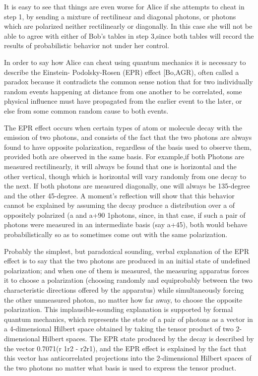 It is easy to see that things are even worse for Alice if she attempts to cheat in step 1, by sending a mixture of rectilinear and diagonal pho­tons, or photons which are polarized neither rectil­inearly or diagonally. In this case she will not be able to agree with either of Bob's tables in step 3,since both tables will record the results of proba­bilistic behavior not under her control.

In order to say how Alice can cheat using quantum mechanics it is necessary to describe the Einstein- Podolsky-Rosen (EPR) effect [Bo,AGR), often called a paradox because it contradicts the common ­sense notion that for two individually random events happening at distance from one another to be corre­lated, some physical influence must have propagated from the earlier event to the later, or else from some common random cause to both events.

The EPR effect occurs when certain types of atom or molecule decay with the emission of two pho­tons, and consists of the fact that the two photons are always found to have opposite polarization, re­gardless of the basis used to observe them, provided both are observed in the same basis. For example,if both Photons are measured rectilinearly, it will always be found that one is horizontal and the other vertical, though which is horizontal will vary ran­domly from one decay to the next. If both photons are measured diagonally, one will always be 135-degree and the other 45-degree. A moment's reflec­tion will show that this behavior cannot be explained by assuming the decay produce a distribution over a of oppositely polarized (a and a+90 1photons, since, in that case, if such a pair of photons were measured in an intermediate basis (say a+45), both would behave probabilistically so as to sometimes come out with the same polarization.

Probably the simplest, but paradoxical ­sounding, verbal explanation of the EPR effect is to say that the two photons are produced in an initial state of undefined polarization; and when one of them is measured, the measuring apparatus forces it to choose a polarization (choosing randomly and equiprobably between the two characteristic direc­tions offered by the apparatus) while simultaneously forcing the other unmeasured photon, no matter how far away, to choose the opposite polarization. This implausible-sounding explanation is supported by formal quantum mechanics, which represents the state of a pair of photons as a vector in a 4-dimensional Hilbert space obtained by taking the tensor product of two 2-dimensional Hilbert spaces. The EPR state produced by the decay is described by the vector 0.7071(r 1r2 - r2r1), and the EPR effect is explained by the fact that this vector has anticorrelated pro­jections into the 2-dimensional Hilbert spaces of the two photons no matter what basis is used to ex­press the tensor product.


